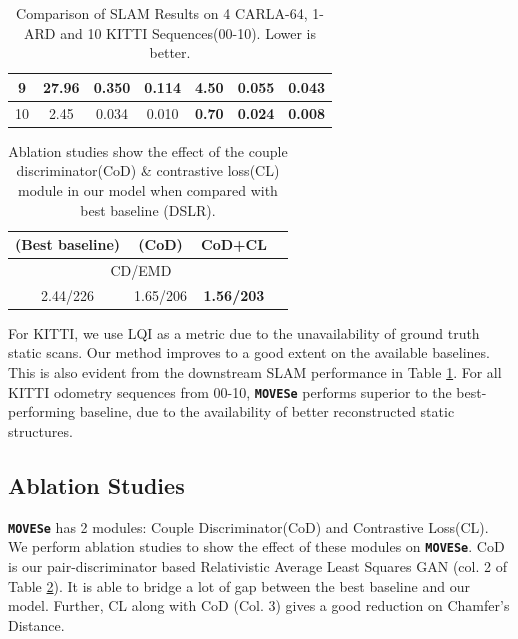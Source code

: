 \documentclass[10pt,twocolumn,letterpaper]{article}
\newcommand{\dslr}{\texttt{\textbf{MOVESe}}}
\begin{document}
\begin{table}[htbp]
\begin{tabular}{|ccccccc|}
\multicolumn{1}{|c|}{9}          & \multicolumn{1}{c|}{27.96}        & \multicolumn{1}{c|}{0.350}            & \multicolumn{1}{c|}{0.114}                & \multicolumn{1}{c|}{\textbf{4.50}}  & \multicolumn{1}{c|}{\textbf{0.055}} & \textbf{0.043}              \\ \hline
\multicolumn{1}{|c|}{10}         & \multicolumn{1}{c|}{2.45}        & \multicolumn{1}{c|}{0.034}            & \multicolumn{1}{c|}{0.010}                & \multicolumn{1}{c|}{\textbf{0.70}}  & \multicolumn{1}{c|}{\textbf{0.024}} & \textbf{0.008}              \\ \hline
\end{tabular}
\caption{Comparison of SLAM Results on 4 CARLA-64, 1-ARD and 10 KITTI Sequences(00-10). Lower is better.}
\label{tab:slamresults}
\end{table}




\setlength{\tabcolsep}{1.5pt}
\begin{table}[htbp]
\centering
\begin{tabular}{|c|c|c|c|}
\hline
 (Best baseline) & (CoD) & CoD+CL \\ \hline
 \multicolumn{3}{|c|}{{CD/EMD}}         \\ \hline
 2.44/226 & 1.65/206 & \textbf{1.56/203}\\ \hline
\end{tabular}
\caption{Ablation studies show the effect of the couple discriminator(CoD) \& contrastive loss(CL) module in our model when compared with best baseline (DSLR).}
\label{tab:ablation}
\end{table}


For KITTI, we use LQI as a metric due to the unavailability of ground truth static scans. Our method improves to a good extent on the available baselines. This is also evident from the downstream SLAM performance in Table \ref{tab:slamresults}. For all KITTI odometry sequences from 00-10, \dslr{} performs superior to the best-performing baseline, due to the availability of better reconstructed static structures. 
\subsection{Ablation Studies}
\dslr{} has 2 modules: Couple Discriminator(CoD) and Contrastive Loss(CL). We perform ablation studies to show the effect of these modules on \dslr{}. CoD is our pair-discriminator based Relativistic Average Least Squares GAN (col. 2 of Table \ref{tab:ablation}). It is able to bridge a lot of gap between the best baseline and our model. Further, CL along with CoD (Col. 3) gives a good reduction on Chamfer's Distance.
\end{document}
